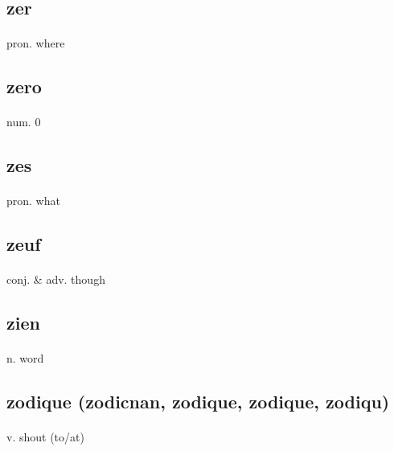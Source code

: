 \documentclass[UTF8]{article}
\begin{document}
    \subsection{zer}
    \paragraph{} pron. where 
    \subsection{zero}
    \paragraph{} num. 0
    \subsection{zes}
    \paragraph{} pron. what 
    \subsection{zeuf}
    \paragraph{} conj. \& adv. though
    \subsection{zien}
    \paragraph{} n. word 
    \subsection{zodique (zodicnan, zodique, zodique, zodiqu)}
    \paragraph{} v. shout (to/at) 
\end{document}
